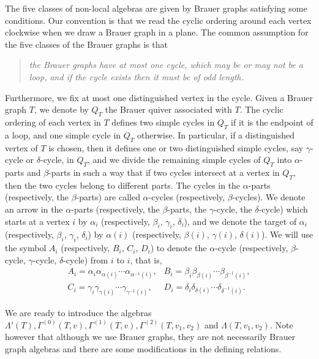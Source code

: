 \documentclass[12pt]{amsart}
\numberwithin{equation}{thm}
\newcounter{ni}
\begin{document}
The five classes of non-local algebras are given by Brauer graphs satisfying some conditions. 
Our convention is that we read the cyclic ordering around each vertex clockwise when we draw a Brauer graph in a plane. 
The common assumption for the five classes of the Brauer graphs is that 
\begin{quote}
\it
the Brauer graphs have at most one cycle, which may be or may not be a loop, and if the cycle exists then it must be of odd length.
\end{quote}
Furthermore, we fix at most one distinguished vertex in the cycle. 
Given a Brauer graph $T$, we denote by $Q_{T}$ the Brauer quiver associated with $T$. 
The cyclic ordering of each vertex in $T$ defines two simple cycles in $Q_{T}$ if it is the endpoint of a loop, and
one simple cycle in $Q_{T}$ otherwise. In particular, 
if a distinguished vertex of $T$ is chosen, then it defines one or two distinguished simple cycles, say $\gamma$-cycle or $\delta$-cycle, in $Q_{T}$, 
and we divide the remaining simple cycles of $Q_{T}$ into $\alpha$-parts and $\beta$-parts 
in such a way that if two cycles intersect at a vertex in $Q_{T}$, then the two cycles belong to different parts. 
The cycles in the $\alpha$-parts (respectively, the $\beta$-parts) 
are called $\alpha$-cycles (respectively, $\beta$-cycles). 
We denote an arrow in the $\alpha$-parts (respectively, the $\beta$-parts, the $\gamma$-cycle, the $\delta$-cycle) 
which starts at a vertex $i$ by $\alpha _{i}$ (respectively, $\beta_{i}$, $\gamma_{i}$, $\delta_{i}$), 
and we denote the target of $\alpha_{i}$ (respectively, $\beta_{i}$, $\gamma_{i}$, $\delta_{i}$) by $\alpha(i)$ (respectively, $\beta(i)$, $\gamma(i)$, $\delta(i)$). We will use the symbol $A_{i}$ (respectively, $B_{i}$, $C_{i}$, $D_{i}$) to denote the $\alpha$-cycle (respectively, $\beta$-cycle, $\gamma$-cycle, $\delta$-cycle) from $i$ to $i$, that is,
\[ \begin{array}{cc}
A_{i}=\alpha_{i}\alpha_{\alpha(i)}\cdots\alpha_{\alpha^{-1}(i)}, &  B_{i}=\beta_{i}\beta_{\beta(i)}\cdots\beta_{\beta^{-1}(i)} ,\\
C_{i}=\gamma_{i}\gamma_{\gamma(i)}\cdots\gamma_{\gamma^{-1}(i)}, &  D_{i}=\delta_{i}\delta_{\delta(i)}\cdots\delta_{\delta^{-1}(i)}.
\end{array}\]

We are ready to introduce the algebras $\Lambda'(T), \Gamma^{(0)}(T,v), \Gamma^{(1)}(T,v), \Gamma^{(2)}(T,v_1,v_2)$ and $\Lambda(T,v_1,v_2)$.
Note however that although we use Brauer graphs, they are not necessarily Brauer graph algebras and 
there are some modifications in the defining relations.
\end{document}
